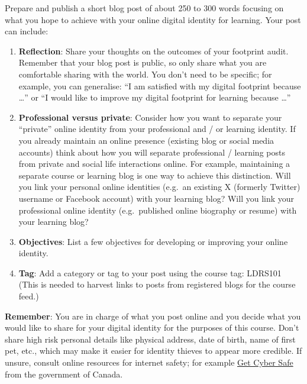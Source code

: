\documentclass[
]{book}
\providecommand{\tightlist}{%
  \setlength{\itemsep}{0pt}\setlength{\parskip}{0pt}}
\theoremstyle{definition}
\theoremstyle{definition}
\theoremstyle{definition}
\theoremstyle{definition}
\theoremstyle{remark}
\begin{document}
\begin{reflect}
Prepare and publish a short blog post of about 250 to 300 words focusing on what you hope to achieve with your online digital identity for learning. Your post can include:

\begin{enumerate}
\def\labelenumi{\arabic{enumi}.}
\tightlist
\item
  \textbf{Reflection}: Share your thoughts on the outcomes of your footprint audit. Remember that your blog post is public, so only share what you are comfortable sharing with the world. You don't need to be specific; for example, you can generalise: ``I am satisfied with my digital footprint because \ldots{}'' or ``I would like to improve my digital footprint for learning because \ldots{}''\\
\item
  \textbf{Professional versus private}: Consider how you want to separate your ``private'' online identity from your professional and / or learning identity. If you already maintain an online presence (existing blog or social media accounts) think about how you will separate professional / learning posts from private and social life interactions online. For example, maintaining a separate course or learning blog is one way to achieve this distinction. Will you link your personal online identities (e.g.~an existing X (formerly Twitter) username or Facebook account) with your learning blog? Will you link your professional online identity (e.g.~published online biography or resume) with your learning blog?\\
\item
  \textbf{Objectives}: List a few objectives for developing or improving your online identity.\\
\item
  \textbf{Tag}: Add a category or tag to your post using the course tag: LDRS101 (This is needed to harvest links to posts from registered blogs for the course feed.)
\end{enumerate}

\textbf{Remember}: You are in charge of what you post online and you decide what you would like to share for your digital identity for the purposes of this course. Don't share high risk personal details like physical address, date of birth, name of first pet, etc., which may make it easier for identity thieves to appear more credible. If unsure, consult online resources for internet safety; for example \href{https://www.getcybersafe.gc.ca/en/secure-your-accounts/social-media}{Get Cyber Safe} from the government of Canada.
\end{reflect}
\end{document}
